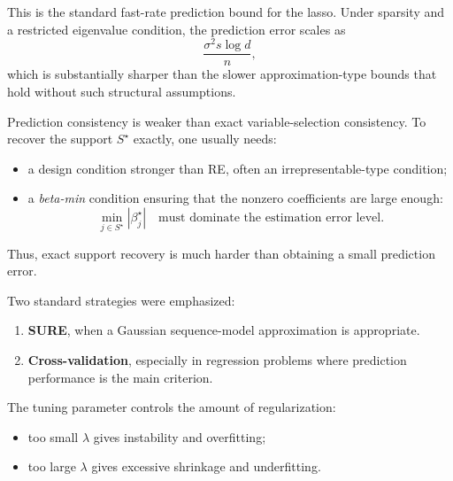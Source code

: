 \begin{remark}
    This is the standard fast-rate prediction bound for the lasso. Under sparsity and a restricted eigenvalue condition, the prediction error scales as
\[
\frac{\sigma^2 s\log d}{n},
\]
which is substantially sharper than the slower approximation-type bounds that hold without such structural assumptions.

\end{remark}


\begin{remark}
    Prediction consistency is weaker than exact variable-selection consistency. To recover the support $S^\star$ exactly, one usually needs:
\begin{itemize}[leftmargin=2em]
    \item a design condition stronger than RE, often an irrepresentable-type condition;
    \item a \emph{beta-min} condition ensuring that the nonzero coefficients are large enough:
    \[
    \min_{j\in S^\star} |\beta_j^\star|
    \quad\text{must dominate the estimation error level.}
    \]
\end{itemize}

Thus, exact support recovery is much harder than obtaining a small prediction error.
\end{remark}

\begin{remark}
    Two standard strategies were emphasized:
\begin{enumerate}[leftmargin=2em]
    \item \textbf{SURE}, when a Gaussian sequence-model approximation is appropriate.
    \item \textbf{Cross-validation}, especially in regression problems where prediction performance is the main criterion.
\end{enumerate}

The tuning parameter controls the amount of regularization:
\begin{itemize}[leftmargin=2em]
    \item too small $\lambda$ gives instability and overfitting;
    \item too large $\lambda$ gives excessive shrinkage and underfitting.
\end{itemize}
\end{remark}








